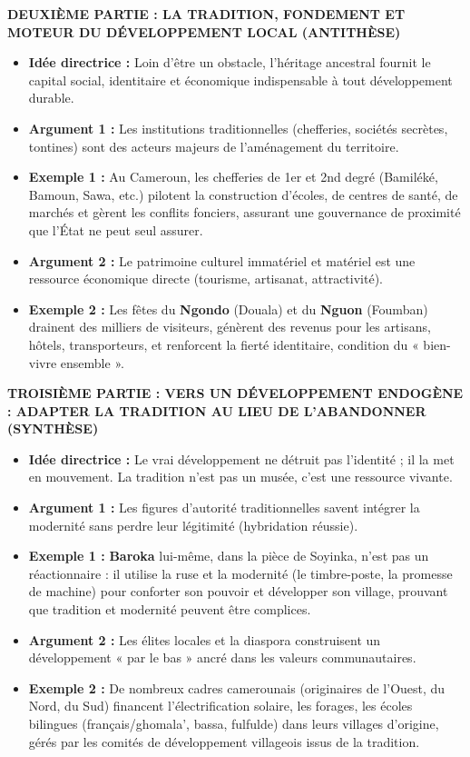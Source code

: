 \documentclass[11pt]{article}
\begin{document}
\begin{exoresolu}
\medskip
\noindent\textbf{DEUXIÈME PARTIE : LA TRADITION, FONDEMENT ET MOTEUR DU DÉVELOPPEMENT LOCAL (ANTITHÈSE)}
\begin{itemize}
\item \textbf{Idée directrice :} Loin d'être un obstacle, l'héritage ancestral fournit le capital social, identitaire et économique indispensable à tout développement durable.
\item \textbf{Argument 1 :} Les institutions traditionnelles (chefferies, sociétés secrètes, tontines) sont des acteurs majeurs de l'aménagement du territoire.
\item \textbf{Exemple 1 :} Au Cameroun, les chefferies de 1er et 2nd degré (Bamiléké, Bamoun, Sawa, etc.) pilotent la construction d'écoles, de centres de santé, de marchés et gèrent les conflits fonciers, assurant une gouvernance de proximité que l'État ne peut seul assurer.
\item \textbf{Argument 2 :} Le patrimoine culturel immatériel et matériel est une ressource économique directe (tourisme, artisanat, attractivité).
\item \textbf{Exemple 2 :} Les fêtes du \textbf{Ngondo} (Douala) et du \textbf{Nguon} (Foumban) drainent des milliers de visiteurs, génèrent des revenus pour les artisans, hôtels, transporteurs, et renforcent la fierté identitaire, condition du « bien-vivre ensemble ».
\end{itemize}

\medskip
\noindent\textbf{TROISIÈME PARTIE : VERS UN DÉVELOPPEMENT ENDOGÈNE : ADAPTER LA TRADITION AU LIEU DE L'ABANDONNER (SYNTHÈSE)}
\begin{itemize}
\item \textbf{Idée directrice :} Le vrai développement ne détruit pas l'identité ; il la met en mouvement. La tradition n'est pas un musée, c'est une ressource vivante.
\item \textbf{Argument 1 :} Les figures d'autorité traditionnelles savent intégrer la modernité sans perdre leur légitimité (hybridation réussie).
\item \textbf{Exemple 1 :} \textbf{Baroka} lui-même, dans la pièce de Soyinka, n'est pas un réactionnaire : il utilise la ruse et la modernité (le timbre-poste, la promesse de machine) pour conforter son pouvoir et développer son village, prouvant que tradition et modernité peuvent être complices.
\item \textbf{Argument 2 :} Les élites locales et la diaspora construisent un développement « par le bas » ancré dans les valeurs communautaires.
\item \textbf{Exemple 2 :} De nombreux cadres camerounais (originaires de l'Ouest, du Nord, du Sud) financent l'électrification solaire, les forages, les écoles bilingues (français/ghomala', bassa, fulfulde) dans leurs villages d'origine, gérés par les comités de développement villageois issus de la tradition.
\end{itemize}


\end{exoresolu}
\end{document}
